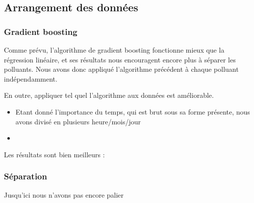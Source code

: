 \subsection{Arrangement des données}

\subsubsection{Gradient boosting}

Comme prévu, l'algorithme de gradient boosting fonctionne mieux que la régression linéaire, et ses résultats nous encouragent encore plus à séparer les polluants. Nous avons donc appliqué l'algorithme précédent à chaque polluant indépendamment. 

En outre, appliquer tel quel l'algorithme aux données est améliorable.
\begin{itemize}
	\item Etant donné l'importance du temps, qui est brut sous sa forme présente, nous avons divisé en plusieurs heure/mois/jour %
	\item 
\end{itemize}  

Les résultats sont bien meilleurs : 



\subsubsection{Séparation}

Jusqu'ici nous n'avons pas encore palier 